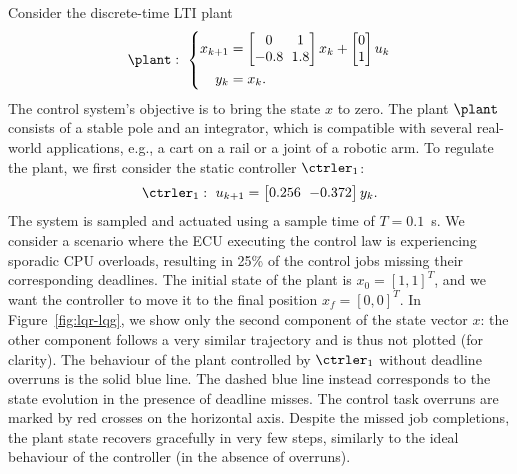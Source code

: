 \begin{example}%
    Consider the discrete-time LTI plant
     \begin{equation}
        \label{eq:example-plant}
        {\setlength\arraycolsep{3pt}
            \plant: \,\, \left\{
            \begin{aligned}
                x_{k+1} &= 
                \begin{bmatrix}
                    0 & 1 \\
                    -0.8 & 1.8
                \end{bmatrix} x_k + 
                \begin{bmatrix}
                    0 \\
                    1
                \end{bmatrix} u_k \\
                y_k &= x_k.
                 \end{aligned}
            \right.
        }
    \end{equation}   
    The control system's objective is to bring the state $x$ to zero.
    The plant $\plant$ consists of a stable pole and an integrator, which is compatible with several real-world applications, e.g., a cart on a rail or a joint of a robotic arm.
    To regulate the plant, we first consider the static controller $\ctrler_1$:
    \begin{equation*}
        {\setlength\arraycolsep{3pt}
        \begin{aligned}
            \ctrler_1: \,\, 
            u_{k+1} = 
            \begin{bmatrix}
                0.256 & -0.372
            \end{bmatrix} y_k.
        \end{aligned}
        }
    \end{equation*}
    The system is sampled and actuated using a sample time of $T = 0.1$~s.
    We consider a scenario where the ECU executing the control law is experiencing sporadic CPU overloads, resulting in 25\% of the control jobs missing their corresponding deadlines.
    The initial state of the plant is $x_0 = [1, 1]^T$, and we want the controller to move it to the final position $x_\mathit{f} = [0, 0]^T$.
    In Figure~\ref{fig:lqr-lqg}, we show only the second component of the state vector $x$: the other component follows a very similar trajectory and is thus not plotted (for clarity).
    The behaviour of the plant controlled by $\ctrler_1$ without deadline overruns is the solid blue line.
    The dashed blue line instead corresponds to the state evolution in the presence of deadline misses.
    The control task overruns are marked by red crosses on the horizontal axis.
    Despite the missed job completions, the plant state recovers gracefully in very few steps, similarly to the ideal behaviour of the controller (in the absence of overruns).
    

\end{example}

